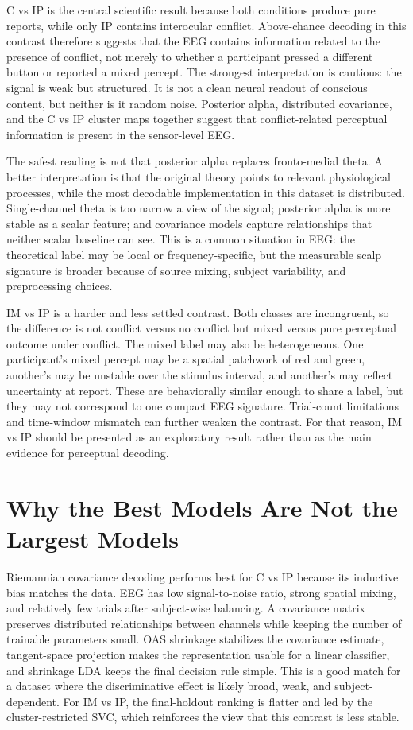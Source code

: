 \documentclass[11pt,a4paper,chapterprefix=false,parskip=false]{scrreprt}
\begin{document}
C vs IP is the central scientific result because both conditions produce pure reports, while only IP contains interocular conflict. Above-chance decoding in this contrast therefore suggests that the EEG contains information related to the presence of conflict, not merely to whether a participant pressed a different button or reported a mixed percept. The strongest interpretation is cautious: the signal is weak but structured. It is not a clean neural readout of conscious content, but neither is it random noise. Posterior alpha, distributed covariance, and the C vs IP cluster maps together suggest that conflict-related perceptual information is present in the sensor-level EEG.

The safest reading is not that posterior alpha replaces fronto-medial theta. A better interpretation is that the original theory points to relevant physiological processes, while the most decodable implementation in this dataset is distributed. Single-channel theta is too narrow a view of the signal; posterior alpha is more stable as a scalar feature; and covariance models capture relationships that neither scalar baseline can see. This is a common situation in EEG: the theoretical label may be local or frequency-specific, but the measurable scalp signature is broader because of source mixing, subject variability, and preprocessing choices.

IM vs IP is a harder and less settled contrast. Both classes are incongruent, so the difference is not conflict versus no conflict but mixed versus pure perceptual outcome under conflict. The mixed label may also be heterogeneous. One participant's mixed percept may be a spatial patchwork of red and green, another's may be unstable over the stimulus interval, and another's may reflect uncertainty at report. These are behaviorally similar enough to share a label, but they may not correspond to one compact EEG signature. Trial-count limitations and time-window mismatch can further weaken the contrast. For that reason, IM vs IP should be presented as an exploratory result rather than as the main evidence for perceptual decoding.

\section{Why the Best Models Are Not the Largest Models}
Riemannian covariance decoding performs best for C vs IP because its inductive bias matches the data. EEG has low signal-to-noise ratio, strong spatial mixing, and relatively few trials after subject-wise balancing. A covariance matrix preserves distributed relationships between channels while keeping the number of trainable parameters small. OAS shrinkage stabilizes the covariance estimate, tangent-space projection makes the representation usable for a linear classifier, and shrinkage LDA keeps the final decision rule simple. This is a good match for a dataset where the discriminative effect is likely broad, weak, and subject-dependent. For IM vs IP, the final-holdout ranking is flatter and led by the cluster-restricted SVC, which reinforces the view that this contrast is less stable.
\end{document}
